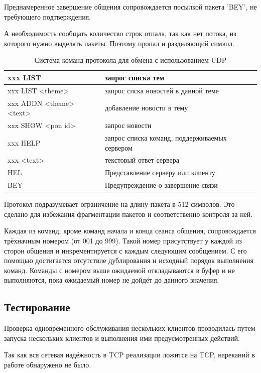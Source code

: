 \documentclass[a4paper]{article}
\begin{document}
Преднамеренное завершение общения сопровождается посылкой пакета 'BEY', не требующего подтверждения.

А необходимость сообщать количество строк отпала, так как нет потока, из которого нужно выделять пакеты. Поэтому пропал и разделяющий символ.
\begin{table}[H]
\begin{center}
\caption{Система команд протокола для обмена с использованием UDP}
\label{tabular:UDPstruct}
\begin{tabular}{|l|l|}
\hline
xxx LIST & запрос списка тем\\ \hline
xxx LIST <theme> & запрос спска новостей в данной теме\\ \hline
xxx ADDN <theme> <text> & добавление новости в тему\\ \hline
xxx SHOW <pon id> & запрос новости\\ \hline
xxx HELP & запрос списка команд, поддерживаемых сервером\\ \hline
xxx <text> & текстовый ответ сервера\\ \hline
HEL & Представление серверу или клиенту\\ \hline
BEY & Предупреждение о завершение связи\\ \hline
\end{tabular}
\end{center}
\end{table}

Протокол подразумевает ограничение на длину пакета в 512 символов. Это сделано для избежания фрагментации пакетов и соответственно контроля за ней.

Каждая из команд, кроме команд начала и конца сеанса общения, сопровождается трёхначным номером (от 001 до 999). Такой номер присутствует у каждой из сторон общения и инкрементируется с каждым следующим сообщением. С его помощью достигается отсутствие дублирования и исходный порядок выполнения команд. Команды с номером выше ожидаемой откладываются в буфер и не выполняются, пока ожидаемый номер не дойдёт до данного значения.
\subsection{Тестирование}
Проверка одновременного обслуживания нескольких клиентов проводилась путем запуска нескольких клиентов и выполнения ими предусмотренных действий.

Так как вся сетевая надёжность в TCP реализации ложится на TCP, нареканий в работе обнаружено не было.
\end{document}
